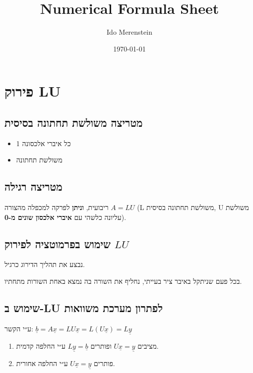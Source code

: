 \documentclass[11pt]{article}
\author{Ido Merenstein}
\date{\today}
\title{Numerical Formula Sheet}
\begin{document}
\maketitle
\tableofcontents



\section{פירוק LU}
\label{sec:org61d95a2}
\subsection{מטריצה משולשת תחתונה בסיסית}
\label{sec:orgda3073d}
\begin{itemize}
\item כל איברי אלכסונה 1
\item משולשת תחתונה
\end{itemize}

\subsection{מטריצה רגילה}
\label{sec:org648c196}
ריבועית, \textbf{\textbf{וניתן}} לפרקה למכפלה מהצורה \(A=LU\)
(L משולשת תחתונה בסיסית, U משולשת עליונה כלשהי עם \textbf{\textbf{איברי אלכסון שונים מ-0}}).

\subsection{שימוש בפרמוטציה לפירוק \(LU\)}
\label{sec:orgfc8ae51}
נבצע את תהליך הדירוג כרגיל.

בכל פעם שניתקל באיבר ציר בעייתי, נחליף את השורה בה נמצא באחת השורות מתחתיו.



\subsection{שימוש ב-LU לפתרון מערכת משוואות}
\label{sec:org7319edd}
ע״י הקשר: \(\underline{b} = A \underline{x} = LU \underline{x} = L \left( U \underline{x} \right) = L \underline{y}\)

\begin{enumerate}
\item מציבים \(U\underline{x} = \underline{y}\) ופותרים \(L\underline{y} = \underline{b}\) ע״י החלפה קדמית.
\item פותרים \(U\underline{x} = \underline{y}\) ע״י החלפה אחורית.
\end{enumerate}
\end{document}
